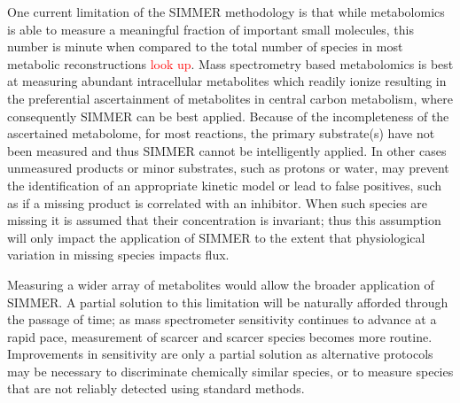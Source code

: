 One current limitation of the SIMMER methodology is that while metabolomics is able to measure a meaningful fraction of important small molecules, this number is minute when compared to the total number of species in most metabolic reconstructions \textcolor{red}{look up}. Mass spectrometry based metabolomics is best at measuring abundant intracellular metabolites which readily ionize resulting in the preferential ascertainment of metabolites in central carbon metabolism, where consequently SIMMER can be best applied. Because of the incompleteness of the ascertained metabolome, for most reactions, the primary substrate(s) have not been measured and thus SIMMER cannot be intelligently applied. In other cases unmeasured products or minor substrates, such as protons or water, may prevent the identification of an appropriate kinetic model or lead to false positives, such as if a missing product is correlated with an inhibitor.  When such species are missing it is assumed that their concentration is invariant; thus this assumption will only impact the application of SIMMER to the extent that physiological variation in missing species impacts flux.

Measuring a wider array of metabolites would allow the broader application of SIMMER. A partial solution to this limitation will be naturally afforded through the passage of time; as mass spectrometer sensitivity continues to advance at a rapid pace, measurement of scarcer and scarcer species becomes more routine. Improvements in sensitivity are only a partial solution as alternative protocols may be necessary to discriminate chemically similar species, or to measure species that are not reliably detected using standard methods. 

